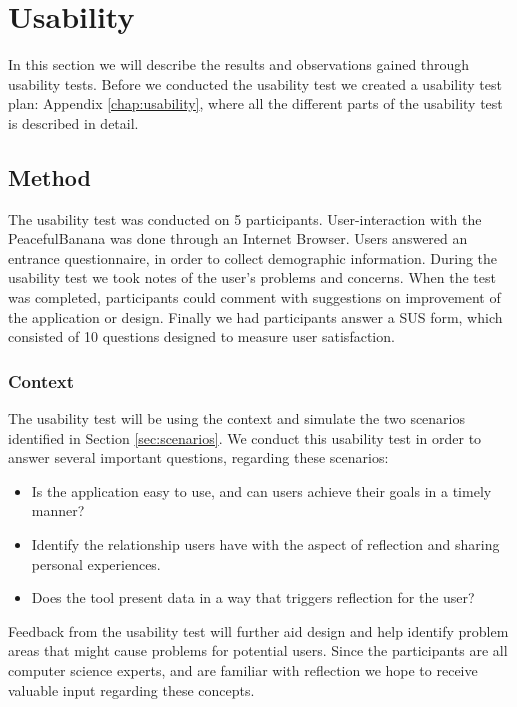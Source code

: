 
\chapter{Usability}
In this section we will describe the results and observations gained through usability tests. Before we conducted the usability test we created a usability test plan: Appendix \ref{chap:usability}, where all the different parts of the usability test is described in detail.
\section{Method}
The usability test was conducted on 5 participants. User-interaction with the PeacefulBanana was done through an Internet Browser. Users answered an entrance questionnaire, in order to collect demographic information. During the usability test we took notes of the user's problems and concerns. When the test was completed, participants could comment with suggestions on improvement of the application or design. Finally we had participants answer a SUS form, which consisted of 10 questions designed to measure user satisfaction. 

\subsection{Context}
The usability test will be using the context and simulate the two scenarios identified in Section \ref{sec:scenarios}. We conduct this usability test in order to answer several important questions, regarding these scenarios: 
\begin{itemize}
	\item Is the application easy to use, and can users achieve their goals in a timely manner?
	\item Identify the relationship users have with the aspect of reflection and sharing personal experiences.
	\item Does the tool present data in a way that triggers reflection for the user?
\end{itemize}
Feedback from the usability test will further aid design and help identify problem areas that might cause problems for potential users. Since the participants are all computer science experts, and are familiar with reflection we hope to receive valuable input regarding these concepts.

